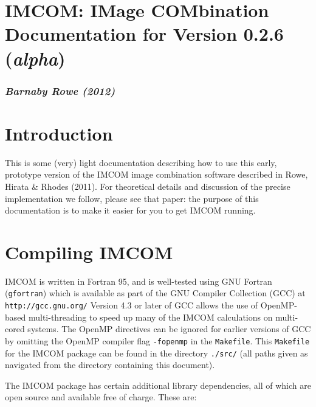 \documentclass[10pt]{article}
\begin{document}
\setlength{\parskip}{2.0ex plus 0.5ex minus 0.5ex}
\setlength{\parindent}{0cm} 

\section*{IMCOM: IMage COMbination \\ Documentation for Version 0.2.6 (\emph{alpha})}
\subsubsection*{\emph{Barnaby Rowe (2012)}}

\section{Introduction}
This is some (very) light documentation describing how to use this early, prototype version of the IMCOM image combination software described in Rowe, Hirata \& Rhodes (2011).  For theoretical details and discussion of the precise implementation we follow, please see that paper: the purpose of this documentation is to make it easier for you to get IMCOM running.

\section{Compiling IMCOM}
IMCOM is written in Fortran 95, and is well-tested using GNU Fortran (\texttt{gfortran}) which is available as part of the GNU Compiler Collection (GCC) at \newline
\texttt{http://gcc.gnu.org/} \newline
Version 4.3 or later of GCC allows the use of OpenMP-based multi-threading to speed up many of the IMCOM calculations on multi-cored systems.  The OpenMP directives can be ignored for earlier versions of GCC by omitting the OpenMP compiler flag \texttt{-fopenmp} in the \texttt{Makefile}.  This \texttt{Makefile} for the IMCOM package can be found in the directory \texttt{./src/} (all paths given as navigated from the directory containing this document).

The IMCOM package has certain additional library dependencies, all of which are open source and available free of charge.  These are:
\end{document}
